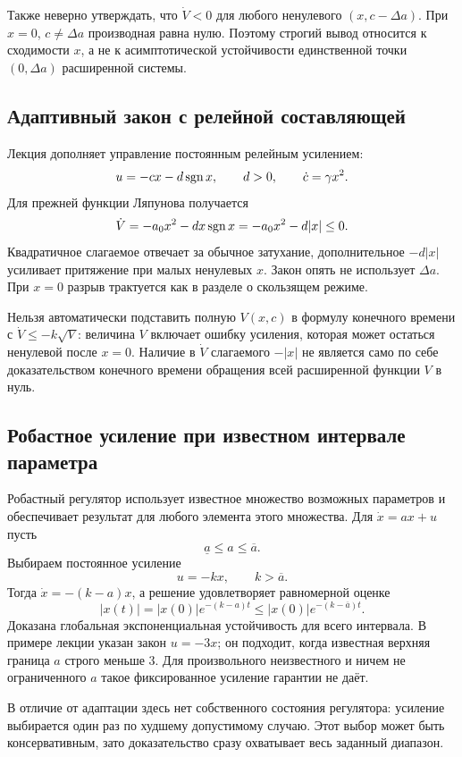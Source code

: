 Также неверно утверждать, что $\dot V<0$ для любого ненулевого
$(x,c-\Delta a)$. При $x=0$, $c\ne\Delta a$ производная равна нулю.
Поэтому строгий вывод относится к сходимости $x$, а не к асимптотической
устойчивости единственной точки $(0,\Delta a)$ расширенной системы.

\subsection{Адаптивный закон с релейной составляющей}

Лекция дополняет управление постоянным релейным усилением:
\[
 u=-cx-d\operatorname{sgn} x,\qquad d>0,\qquad \dot c=\gamma x^2.
\]
Для прежней функции Ляпунова получается
\[
 \dot V=-a_0x^2-dx\operatorname{sgn} x=-a_0x^2-d|x|\le0.
\]
Квадратичное слагаемое отвечает за обычное затухание, дополнительное
$-d|x|$ усиливает притяжение при малых ненулевых $x$.
Закон опять не использует $\Delta a$. При $x=0$ разрыв трактуется
как в разделе о скользящем режиме.

\addition Нельзя автоматически подставить полную $V(x,c)$ в формулу
конечного времени с $\dot V\le-k\sqrt V$: величина $V$ включает ошибку
усиления, которая может остаться ненулевой после $x=0$.
Наличие в $\dot V$ слагаемого $-|x|$ не является само по себе доказательством
конечного времени обращения всей расширенной функции $V$ в нуль.

\subsection{Робастное усиление при известном интервале параметра}

Робастный регулятор использует известное множество возможных параметров
и обеспечивает результат для любого элемента этого множества.
Для $\dot x=ax+u$ пусть
\[
 \underline a\le a\le\overline a.
\]
Выбираем постоянное усиление
\[
 u=-kx,\qquad k>\overline a.
\]
Тогда $\dot x=-(k-a)x$, а решение удовлетворяет равномерной оценке
\[
 |x(t)|=|x(0)|e^{-(k-a)t}
 \le|x(0)|e^{-(k-\overline a)t}.
\]
Доказана глобальная экспоненциальная устойчивость для всего интервала.
В примере лекции указан закон $u=-3x$; он подходит, когда известная верхняя
граница $a$ строго меньше $3$. Для произвольного неизвестного и ничем
не ограниченного $a$ такое фиксированное усиление гарантии не даёт.

В отличие от адаптации здесь нет собственного состояния регулятора:
усиление выбирается один раз по худшему допустимому случаю. Этот выбор
может быть консервативным, зато доказательство сразу охватывает весь
заданный диапазон.

